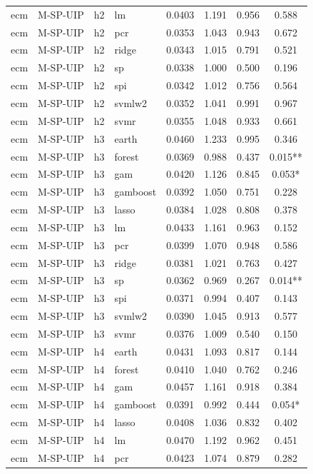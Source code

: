 \begin{ThreePartTable}
\begin{longtable}[t]{llclcccc}
ecm & M-SP-UIP & h2 & lm & 0.0403 & 1.191 & 0.956 & 0.588\\
ecm & M-SP-UIP & h2 & pcr & 0.0353 & 1.043 & 0.943 & 0.672\\
ecm & M-SP-UIP & h2 & ridge & 0.0343 & 1.015 & 0.791 & 0.521\\
ecm & M-SP-UIP & h2 & sp & 0.0338 & 1.000 & 0.500 & 0.196\\
ecm & M-SP-UIP & h2 & spi & 0.0342 & 1.012 & 0.756 & 0.564\\
ecm & M-SP-UIP & h2 & svmlw2 & 0.0352 & 1.041 & 0.991 & 0.967\\
ecm & M-SP-UIP & h2 & svmr & 0.0355 & 1.048 & 0.933 & 0.661\\
\addlinespace
ecm & M-SP-UIP & h3 & earth & 0.0460 & 1.233 & 0.995 & 0.346\\
ecm & M-SP-UIP & h3 & forest & 0.0369 & 0.988 & 0.437 & 0.015**\\
ecm & M-SP-UIP & h3 & gam & 0.0420 & 1.126 & 0.845 & 0.053*\\
ecm & M-SP-UIP & h3 & gamboost & 0.0392 & 1.050 & 0.751 & 0.228\\
ecm & M-SP-UIP & h3 & lasso & 0.0384 & 1.028 & 0.808 & 0.378\\
ecm & M-SP-UIP & h3 & lm & 0.0433 & 1.161 & 0.963 & 0.152\\
ecm & M-SP-UIP & h3 & pcr & 0.0399 & 1.070 & 0.948 & 0.586\\
ecm & M-SP-UIP & h3 & ridge & 0.0381 & 1.021 & 0.763 & 0.427\\
ecm & M-SP-UIP & h3 & sp & 0.0362 & 0.969 & 0.267 & 0.014**\\
ecm & M-SP-UIP & h3 & spi & 0.0371 & 0.994 & 0.407 & 0.143\\
ecm & M-SP-UIP & h3 & svmlw2 & 0.0390 & 1.045 & 0.913 & 0.577\\
ecm & M-SP-UIP & h3 & svmr & 0.0376 & 1.009 & 0.540 & 0.150\\
\addlinespace
ecm & M-SP-UIP & h4 & earth & 0.0431 & 1.093 & 0.817 & 0.144\\
ecm & M-SP-UIP & h4 & forest & 0.0410 & 1.040 & 0.762 & 0.246\\
ecm & M-SP-UIP & h4 & gam & 0.0457 & 1.161 & 0.918 & 0.384\\
ecm & M-SP-UIP & h4 & gamboost & 0.0391 & 0.992 & 0.444 & 0.054*\\
ecm & M-SP-UIP & h4 & lasso & 0.0408 & 1.036 & 0.832 & 0.402\\
ecm & M-SP-UIP & h4 & lm & 0.0470 & 1.192 & 0.962 & 0.451\\
ecm & M-SP-UIP & h4 & pcr & 0.0423 & 1.074 & 0.879 & 0.282\\

\end{longtable}
\end{ThreePartTable}
